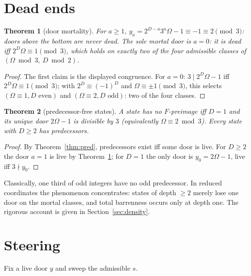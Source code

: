 \documentclass[11pt]{article}
\newtheorem{theorem}{Theorem}[section]
\theoremstyle{remark}
\begin{document}
\section{Dead ends}\label{sec:dead}

\begin{theorem}[door mortality]\label{thm:mort}
For $a \ge 1$, $y_a = 2^{D-a}3^a\Omega - 1 \equiv -1 \equiv 2 \pmod 3$: doors above the bottom are never dead. The sole mortal door is $a = 0$: it is dead iff $2^D\Omega \equiv 1 \pmod 3$, which holds on exactly two of the four admissible classes of $(\Omega \bmod 3,\ D \bmod 2)$.
\end{theorem}

\begin{proof}
The first claim is the displayed congruence. For $a = 0$: $3 \mid 2^D\Omega - 1$ iff $2^D\Omega \equiv 1 \pmod 3$; with $2^D \equiv (-1)^D$ and $\Omega \equiv \pm1 \pmod 3$, this selects $(\Omega \equiv 1, D \text{ even})$ and $(\Omega \equiv 2, D \text{ odd})$: two of the four classes.
\end{proof}

\begin{theorem}[predecessor-free states]\label{thm:eden}
A state has no $F$-preimage iff $D = 1$ and its unique door $2\Omega - 1$ is divisible by $3$ (equivalently $\Omega \equiv 2 \bmod 3$). Every state with $D \ge 2$ has predecessors.
\end{theorem}

\begin{proof}
By Theorem~\ref{thm:pred}, predecessors exist iff some door is live. For $D \ge 2$ the door $a = 1$ is live by Theorem~\ref{thm:mort}; for $D = 1$ the only door is $y_0 = 2\Omega - 1$, live iff $3 \nmid y_0$.
\end{proof}

Classically, one third of odd integers have no odd predecessor. In reduced coordinates the phenomenon concentrates: states of depth $\ge 2$ merely lose one door on the mortal classes, and total barrenness occurs only at depth one. The rigorous account is given in Section~\ref{sec:density}.

\section{Steering}\label{sec:steer}

Fix a live door $y$ and sweep the admissible $s$.
\end{document}

